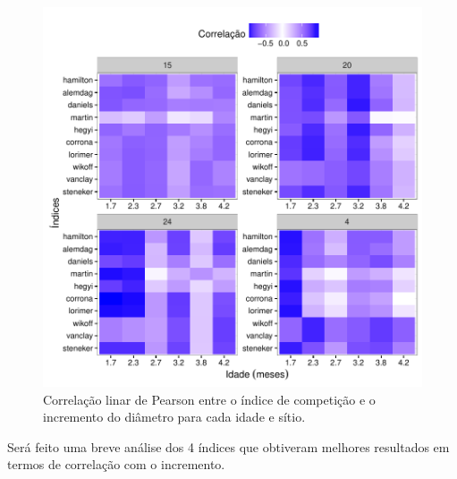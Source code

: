 \documentclass[article]{jss}
\begin{document}
\begin{CodeChunk}
\begin{figure}

{\centering \includegraphics{comp3-paper_files/figure-latex/heatmap_corr-1} 

}

\caption[Correlação linar de Pearson entre o índice de competição e o incremento do diâmetro para cada idade e sítio]{Correlação linar de Pearson entre o índice de competição e o incremento do diâmetro para cada idade e sítio.}\label{fig:heatmap_corr}
\end{figure}
\end{CodeChunk}

Será feito uma breve análise dos 4 índices que obtiveram melhores
resultados em termos de correlação com o incremento.

\subsection{}\label{section}
\end{document}
